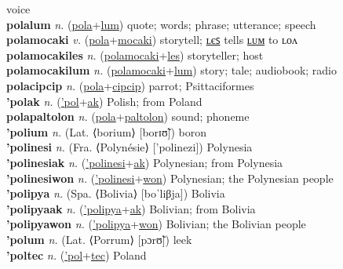 voice \label{polaluat} \\
\textbf{polalum} \textit{n.} (\hyperref[pola]{pola}+\hyperref[lum]{lum})
quote; words; phrase; utterance; speech \label{polalum} \\
\textbf{polamocaki} \textit{v.} (\hyperref[pola]{pola}+\hyperref[mocaki]{mocaki})
storytell; \hyperref[polamocakiles]{ʟєꜱ} tells \hyperref[polamocakilum]{ʟᴜᴍ} to ʟᴏᴧ \label{polamocaki} \\
\textbf{polamocakiles} \textit{n.} (\hyperref[polamocaki]{polamocaki}+\hyperref[les]{les})
storyteller; host \label{polamocakiles} \\
\textbf{polamocakilum} \textit{n.} (\hyperref[polamocaki]{polamocaki}+\hyperref[lum]{lum})
story; tale; audiobook; radio \label{polamocakilum} \\
\textbf{polacipcip} \textit{n.} (\hyperref[pola]{pola}+\hyperref[cipcip]{cipcip})
parrot; Psittaciformes \label{polacipcip} \\
\textbf{'polak} \textit{n.} (\hyperref['pol]{'pol}+\hyperref[ak]{ak})
Polish; from Poland \label{'polak} \\
\textbf{polapaltolon} \textit{n.} (\hyperref[pola]{pola}+\hyperref[paltolon]{paltolon})
sound; phoneme \label{polapaltolon} \\
\textbf{'polium} \textit{n.} (Lat. ⟨borium⟩ [borɪʊ̃])
boron \label{'polium} \\
\textbf{'polinesi} \textit{n.} (Fra. ⟨Polynésie⟩ ['polinezi])
Polynesia \label{'polinesi} \\
\textbf{'polinesiak} \textit{n.} (\hyperref['polinesi]{'polinesi}+\hyperref[ak]{ak})
Polynesian; from Polynesia \label{'polinesiak} \\
\textbf{'polinesiwon} \textit{n.} (\hyperref['polinesi]{'polinesi}+\hyperref[won]{won})
Polynesian; the Polynesian people \label{'polinesiwon} \\
\textbf{'polipya} \textit{n.} (Spa. ⟨Bolivia⟩ [boˈliβja])
Bolivia \label{'polipya} \\
\textbf{'polipyaak} \textit{n.} (\hyperref['polipya]{'polipya}+\hyperref[ak]{ak})
Bolivian; from Bolivia \label{'polipyaak} \\
\textbf{'polipyawon} \textit{n.} (\hyperref['polipya]{'polipya}+\hyperref[won]{won})
Bolivian; the Bolivian people \label{'polipyawon} \\
\textbf{'polum} \textit{n.} (Lat. ⟨Porrum⟩ [pɔrʊ̃])
leek \label{'polum} \\
\textbf{'poltec} \textit{n.} (\hyperref['pol]{'pol}+\hyperref[tec]{tec})
Poland \label{'poltec} \\
